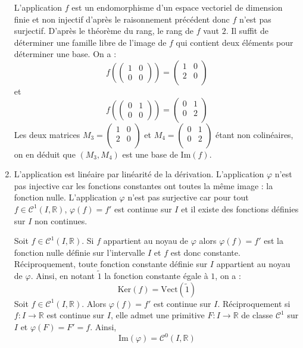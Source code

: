 \documentclass[a4paper,10pt]{report}
\begin{document}
\begin{enumerate}
\noindent L'application $f$ est un endomorphisme d'un espace vectoriel de dimension finie et non injectif d'après le raisonnement précédent donc $f$ n'est pas surjectif. D'après le théorème du rang, le rang de $f$ vaut $2$. Il suffit de déterminer une famille libre de l'image de $f$ qui contient deux éléments pour déterminer une base. On a :
$$  f \left( \begin{pmatrix}
1 & 0 \\
0 & 0
\end{pmatrix} \right) = \begin{pmatrix}
1 & 0 \\
2 & 0 \\
\end{pmatrix}$$
et 
$$  f \left( \begin{pmatrix}
0 & 1 \\
0 & 0
\end{pmatrix} \right) = \begin{pmatrix}
0 & 1 \\
0 & 2 \\
\end{pmatrix}$$
Les deux matrices $M_3=\begin{pmatrix}
1 & 0 \\
2 & 0 \\
\end{pmatrix}$ et $M_4=\begin{pmatrix}
0 & 1 \\
0 & 2 \\
\end{pmatrix}$ étant non colinéaires, on en déduit que $(M_3,M_4)$ est une base de $\textrm{Im}(f)$.
\item L'application est linéaire par linéarité de la dérivation. L'application $\varphi$ n'est pas injective car les fonctions constantes ont toutes la même image : la fonction nulle. L'application $\varphi$ n'est pas surjective car pour tout $f \in \mathcal{C}^1(I, \mathbb{R})$, $\varphi(f)=f'$ est continue sur $I$ et il existe des fonctions définies sur $I$ non continues.
\medskip

\noindent Soit $f \in \mathcal{C}^1(I, \mathbb{R})$. Si $f$ appartient au noyau de $\varphi$ alors $\varphi(f)=f'$ est la fonction nulle définie sur l'intervalle $I$ et $f$ est donc constante. Réciproquement, toute fonction constante définie sur $I$ appartient au noyau de $\varphi$. Ainsi, en notant $\tilde{1}$ la fonction constante égale à $1$, on a :
$$ \textrm{Ker}(f) = \textrm{Vect}( \tilde{1} )$$
Soit $f \in \mathcal{C}^1(I, \mathbb{R})$. Alors $\varphi(f) = f'$ est continue sur $I$. Réciproquement si $f : I \rightarrow \mathbb{R}$ est continue sur $I$, elle admet une primitive $F : I \rightarrow \mathbb{R}$ de classe $\mathcal{C}^1$ sur $I$ et $\varphi(F)=F'=f$. Ainsi, 
$$  \textrm{Im}(\varphi) = \mathcal{C}^0(I, \mathbb{R})$$
\end{enumerate}
\end{document}
